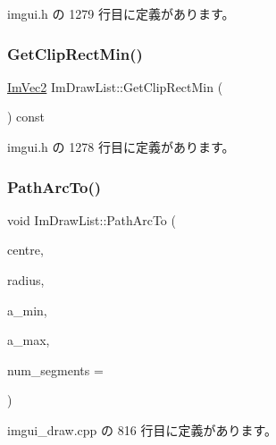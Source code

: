  imgui.\+h の 1279 行目に定義があります。

\mbox{\label{struct_im_draw_list_a9d83896d3eb434a9e1072d56523a2754}} 
\subsubsection{\texorpdfstring{Get\+Clip\+Rect\+Min()}{GetClipRectMin()}}
{\footnotesize\ttfamily \mbox{\hyperlink{struct_im_vec2}{Im\+Vec2}} Im\+Draw\+List\+::\+Get\+Clip\+Rect\+Min (\begin{DoxyParamCaption}{ }\end{DoxyParamCaption}) const\hspace{0.3cm}{\ttfamily [inline]}}



 imgui.\+h の 1278 行目に定義があります。

\mbox{\label{struct_im_draw_list_acb69ef7febcc54c9e5e09d2460c85b61}} 
\subsubsection{\texorpdfstring{Path\+Arc\+To()}{PathArcTo()}}
{\footnotesize\ttfamily void Im\+Draw\+List\+::\+Path\+Arc\+To (\begin{DoxyParamCaption}\item[{const \mbox{\hyperlink{struct_im_vec2}{Im\+Vec2}} \&}]{centre,  }\item[{float}]{radius,  }\item[{float}]{a\+\_\+min,  }\item[{float}]{a\+\_\+max,  }\item[{int}]{num\+\_\+segments = {} }\end{DoxyParamCaption})}



 imgui\+\_\+draw.\+cpp の 816 行目に定義があります。

\mbox{\label{struct_im_draw_list_a713cca3862e88aa1ee671db1c4cf6bdb}} 
